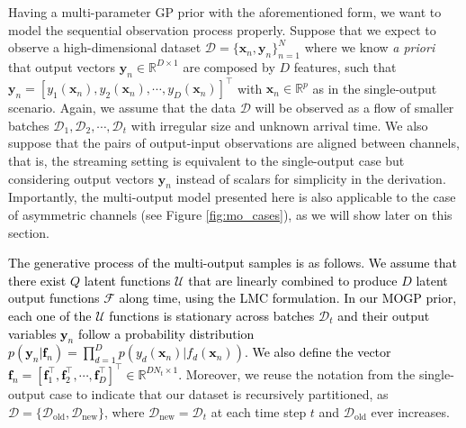 \documentclass[]{article}
\def\f{{\mathbf f}}
\newcommand{\Rbb}{\mathbb{R}}
\newcommand{\Fcal}{\mathcal{F}}
\newcommand{\Ucal}{\mathcal{U}}
\newcommand{\Dcal}{\mathcal{D}}
\newcommand{\xc}{\bm{x}}
\newcommand{\yc}{\bm{y}}
\begin{document}
Having a multi-parameter GP prior with the aforementioned form, we want to model the sequential observation process properly. Suppose that we expect to observe a high-dimensional dataset $\mathcal{D}=\{\xc_n, \yc_n\}^N_{n=1}$ where we know \textit{a priori} that output vectors $\yc_n \in \Rbb^{D\times 1}$ are composed by $D$ features, such that $\yc_n = [y_1(\xc_n), y_2(\xc_n),\cdots, y_D(\xc_n)]^\top$ with $\xc_n \in \Rbb^p$ as in the single-output scenario. Again, we assume that the data $\mathcal{D}$ will be observed as a flow of smaller batches $\Dcal_1, \Dcal_2, \cdots, \Dcal_t$ with irregular size and unknown arrival time. We also suppose that the pairs of output-input observations are aligned between channels, that is, the streaming setting is equivalent to the single-output case but considering output vectors $\yc_n$ instead of scalars for simplicity in the derivation. Importantly, the multi-output model presented here is also applicable to the case of asymmetric channels (see Figure \ref{fig:mo_cases}), as we will show later on this section.

\textcolor{black}{The generative process of the multi-output samples is as follows. We assume that there exist $Q$ latent functions $\Ucal$ that are linearly combined to produce $D$ latent output functions $\Fcal$ along time, using the LMC formulation. In our MOGP prior, each one of the $\Ucal$ functions is stationary across batches $\Dcal_t$ and their output variables $\yc_n$ follow a probability distribution $p(\yc_n|\f_n) = \prod_{d=1}^{D}p(y_d(\xc_n)|f_d(\xc_n))$. We also define the vector $\f_n = [\f_1^\top, \f_2^\top, \cdots, \f^\top_D]^\top \in \Rbb^{DN_t \times 1}$.} Moreover, we reuse the notation from the single-output case to indicate that our dataset is recursively partitioned, as $\Dcal = \{\Dcal_{\text{old}}, \Dcal_{\text{new}}\}$, where $\Dcal_{\text{new}} = \Dcal_t$ at each time step $t$ and $\Dcal_{\text{old}}$ ever increases.
\end{document}
